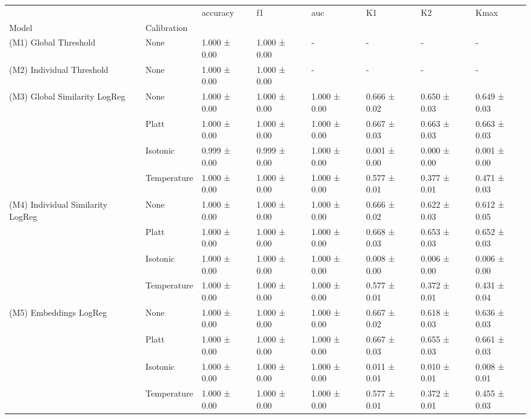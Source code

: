 \begin{tabular}{llllllll}
\toprule
 &  & accuracy & f1 & auc & K1 & K2 & Kmax \\
Model & Calibration &  &  &  &  &  &  \\
\midrule
(M1) Global Threshold & None & 1.000 ± 0.00 & 1.000 ± 0.00 & - & - & - & - \\
\cline{1-8}
(M2) Individual Threshold & None & 1.000 ± 0.00 & 1.000 ± 0.00 & - & - & - & - \\
\cline{1-8}
\multirow[t]{4}{*}{(M3) Global Similarity LogReg} & None & 1.000 ± 0.00 & 1.000 ± 0.00 & 1.000 ± 0.00 & 0.666 ± 0.02 & 0.650 ± 0.03 & 0.649 ± 0.03 \\
 & Platt & 1.000 ± 0.00 & 1.000 ± 0.00 & 1.000 ± 0.00 & 0.667 ± 0.03 & 0.663 ± 0.03 & 0.663 ± 0.03 \\
 & Isotonic & 0.999 ± 0.00 & 0.999 ± 0.00 & 1.000 ± 0.00 & 0.001 ± 0.00 & 0.000 ± 0.00 & 0.001 ± 0.00 \\
 & Temperature & 1.000 ± 0.00 & 1.000 ± 0.00 & 1.000 ± 0.00 & 0.577 ± 0.01 & 0.377 ± 0.01 & 0.471 ± 0.03 \\
\cline{1-8}
\multirow[t]{4}{*}{(M4) Individual Similarity LogReg} & None & 1.000 ± 0.00 & 1.000 ± 0.00 & 1.000 ± 0.00 & 0.666 ± 0.02 & 0.622 ± 0.03 & 0.612 ± 0.05 \\
 & Platt & 1.000 ± 0.00 & 1.000 ± 0.00 & 1.000 ± 0.00 & 0.668 ± 0.03 & 0.653 ± 0.03 & 0.652 ± 0.03 \\
 & Isotonic & 1.000 ± 0.00 & 1.000 ± 0.00 & 1.000 ± 0.00 & 0.008 ± 0.00 & 0.006 ± 0.00 & 0.006 ± 0.00 \\
 & Temperature & 1.000 ± 0.00 & 1.000 ± 0.00 & 1.000 ± 0.00 & 0.577 ± 0.01 & 0.372 ± 0.01 & 0.431 ± 0.04 \\
\cline{1-8}
\multirow[t]{4}{*}{(M5) Embeddings LogReg} & None & 1.000 ± 0.00 & 1.000 ± 0.00 & 1.000 ± 0.00 & 0.667 ± 0.02 & 0.618 ± 0.03 & 0.636 ± 0.03 \\
 & Platt & 1.000 ± 0.00 & 1.000 ± 0.00 & 1.000 ± 0.00 & 0.667 ± 0.03 & 0.655 ± 0.03 & 0.661 ± 0.03 \\
 & Isotonic & 1.000 ± 0.00 & 1.000 ± 0.00 & 1.000 ± 0.00 & 0.011 ± 0.01 & 0.010 ± 0.01 & 0.008 ± 0.01 \\
 & Temperature & 1.000 ± 0.00 & 1.000 ± 0.00 & 1.000 ± 0.00 & 0.577 ± 0.01 & 0.372 ± 0.01 & 0.455 ± 0.03 \\
\cline{1-8}
\bottomrule
\end{tabular}
